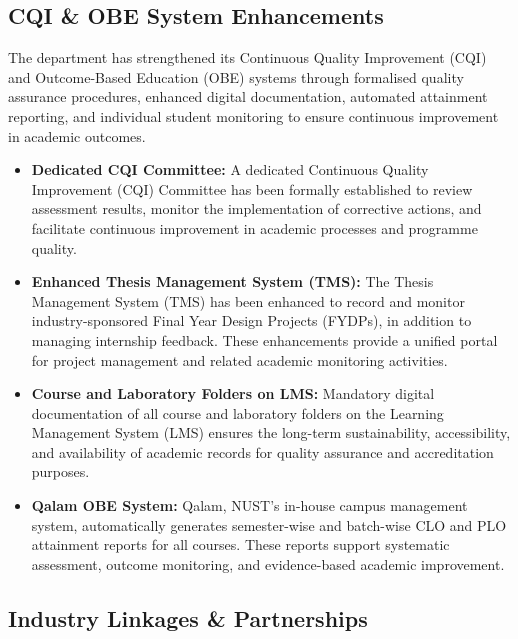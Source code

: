 \subsection{CQI \& OBE System Enhancements}
\label{subsec:cqi-obe-system-enhancements}

The department has strengthened its Continuous Quality
Improvement (CQI) and Outcome-Based Education (OBE) systems
through formalised quality assurance procedures, enhanced
digital documentation, automated attainment reporting, and
individual student monitoring to ensure continuous
improvement in academic outcomes.

\begin{itemize}[noitemsep, topsep=0pt]

    \item \textbf{Dedicated CQI Committee:}
    A dedicated Continuous Quality Improvement (CQI) Committee
    has been formally established to review assessment results,
    monitor the implementation of corrective actions, and
    facilitate continuous improvement in academic processes
    and programme quality.

    \item \textbf{Enhanced Thesis Management System (TMS):}
    The Thesis Management System (TMS) has been enhanced
    to record and monitor industry-sponsored Final Year
    Design Projects (FYDPs), in addition to managing
    internship feedback. These enhancements provide a
    unified portal for project management and related
    academic monitoring activities.

    \item \textbf{Course and Laboratory Folders on LMS:}
    Mandatory digital documentation of all course and
    laboratory folders on the Learning Management System
    (LMS) ensures the long-term sustainability,
    accessibility, and availability of academic records
    for quality assurance and accreditation purposes.

    \item \textbf{Qalam OBE System:}
    Qalam, NUST's in-house campus management system,
    automatically generates semester-wise and batch-wise
    CLO and PLO attainment reports for all courses.
    These reports support systematic assessment,
    outcome monitoring, and evidence-based academic
    improvement.

\end{itemize}

\subsection{Industry Linkages \& Partnerships}
\label{subsec:industry-linkages-partnerships}

